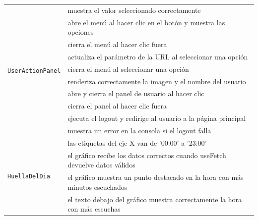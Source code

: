 \begin{longtable}{|p{5cm}|p{9cm}|}
    \multirow{10}{*}{\texttt{UserActionPanel}}      & muestra el valor seleccionado correctamente                                  \\ \cline{2-2}
                                                    & abre el menú al hacer clic en el botón y muestra las opciones                \\ \cline{2-2}
                                                    & cierra el menú al hacer clic fuera                                           \\ \cline{2-2}
                                                    & actualiza el parámetro de la URL al seleccionar una opción                   \\ \cline{2-2}
                                                    & cierra el menú al seleccionar una opción                                     \\ \cline{2-2}
                                                    & renderiza correctamente la imagen y el nombre del usuario                    \\ \cline{2-2}
                                                    & abre y cierra el panel de usuario al hacer clic                              \\ \cline{2-2}
                                                    & cierra el panel al hacer clic fuera                                          \\ \cline{2-2}
                                                    & ejecuta el logout y redirige al usuario a la página principal                \\ \cline{2-2}
                                                    & muestra un error en la consola si el logout falla                            \\ \hline

    \multirow{4}{*}{\texttt{HuellaDelDia}}          & las etiquetas del eje X van de '00:00' a '23:00'                             \\ \cline{2-2}
                                                    & el gráfico recibe los datos correctos cuando useFetch devuelve datos válidos \\ \cline{2-2}
                                                    & el gráfico muestra un punto destacado en la hora con más minutos escuchados  \\ \cline{2-2}
                                                    & el texto debajo del gráfico muestra correctamente la hora con más escuchas   \\ \hline


\end{longtable}
